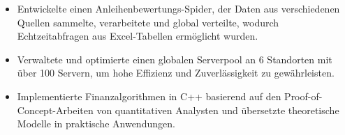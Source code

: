 \begin{itemize}
  \item Entwickelte einen Anleihenbewertungs-Spider, der Daten aus verschiedenen Quellen sammelte, verarbeitete und global verteilte, wodurch Echtzeitabfragen aus Excel-Tabellen ermöglicht wurden.
  \item Verwaltete und optimierte einen globalen Serverpool an 6 Standorten mit über 100 Servern, um hohe Effizienz und Zuverlässigkeit zu gewährleisten.
  \item Implementierte Finanzalgorithmen in C++ basierend auf den Proof-of-Concept-Arbeiten von quantitativen Analysten und übersetzte theoretische Modelle in praktische Anwendungen.
\end{itemize}
\divider
